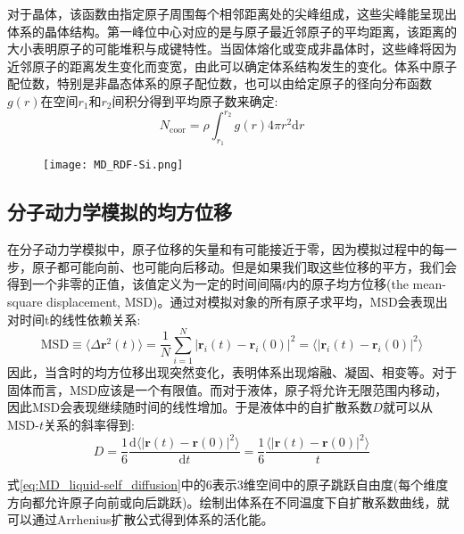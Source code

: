 对于晶体，该函数由指定原子周围每个相邻距离处的尖峰组成，这些尖峰能呈现出体系的晶体结构。第一峰位中心对应的是与原子最近邻原子的平均距离，该距离的大小表明原子的可能堆积与成键特性。当固体熔化或变成非晶体时，这些峰将因为近邻原子的距离发生变化而变宽，由此可以确定体系结构发生的变化。体系中原子配位数，特别是非晶态体系的原子配位数，也可以由给定原子的径向分布函数$g(r)$在空间$r_1$和$r_2$间积分得到平均原子数来确定:
\begin{equation}
	N_{\mathrm{coor}}=\rho\int_{r_1}^{r_2}g(r)4\pi r^2\mathrm{d}r
	\label{eq:MD-N-coop}
\end{equation}
\begin{figure}[h!]
\centering
\vspace*{-0.1in}
\texttt{[image: MD\_RDF-Si.png]}
\caption{\fontsize{7.2pt}{4.2pt}}%
\label{MD_RDF-Si}
\end{figure}

\subsection{分子动力学模拟的均方位移}
在分子动力学模拟中，原子位移的矢量和有可能接近于零，因为模拟过程中的每一步，原子都可能向前、也可能向后移动。但是如果我们取这些位移的平方，我们会得到一个非零的正值，该值定义为一定的时间间隔$t$内的原子均方位移\textrm{(the mean-square displacement, MSD)}。通过对模拟对象的所有原子求平均，\textrm{MSD}会表现出对时间t的线性依赖关系:
\begin{equation}
	\mathrm{MSD}\equiv\langle\Delta\mathbf{r}^2(t)\rangle=\dfrac1N\sum_{i=1}^N|\mathbf{r}_i(t)-\mathbf{r}_i(0)|^2=\big\langle|\mathbf{r}_i(t)-\mathbf{r}_i(0)|^2\big\rangle
	\label{eq:MD_MSD}
\end{equation}
因此，当含时的均方位移出现突然变化，表明体系出现熔融、凝固、相变等。对于固体而言，\textrm{MSD}应该是一个有限值。而对于液体，原子将允许无限范围内移动，因此\textrm{MSD}会表现继续随时间的线性增加。于是液体中的自扩散系数$D$就可以从\textrm{MSD}-$t$关系的斜率得到:
\begin{equation}
	D=\dfrac16\dfrac{\mathrm{d}\langle|\mathbf{r}(t)-\mathbf{r}(0)|^2\rangle}{\mathrm{d}t}=\dfrac16\dfrac{\langle|\mathbf{r}(t)-\mathbf{r}(0)|^2\rangle}{t}
	\label{eq:MD_liquid-self_diffusion}
\end{equation}

式\eqref{eq:MD_liquid-self_diffusion}中的6表示3维空间中的原子跳跃自由度(每个维度方向都允许原子向前或向后跳跃)。绘制出体系在不同温度下自扩散系数曲线，就可以通过\textrm{Arrhenius}扩散公式得到体系的活化能。

